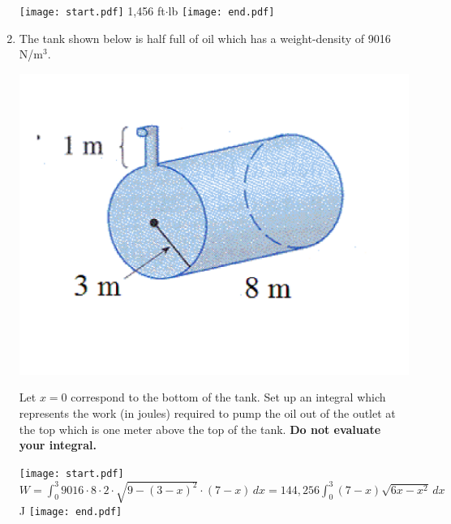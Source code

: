 \documentclass[12pt]{article}
\begin{document}
\begin{enumerate}
\texttt{[image: start.pdf]}
{{1,456 ft$\cdot$lb}}
\texttt{[image: end.pdf]}


\newpage

\item The tank shown below is half full of oil which has a weight-density of 9016 N/m$^3$.  
\begin{center}
\includegraphics[scale=0.3]{tank.pdf}
\end{center}
Let $x=0$ correspond to the bottom of the tank.  Set up an integral which represents the work (in joules) required to pump the oil out of the outlet at the top which is one meter above the top of the tank.  {\bf Do not evaluate your integral.}

\texttt{[image: start.pdf]}
{{$W=\int_0^3 9016 \cdot 8 \cdot 2 \cdot \sqrt{9-(3-x)^2} \cdot (7-x) \,dx= 144,256 \int_0^3 (7-x)\sqrt{6x-x^2}\,dx$ J}}
\texttt{[image: end.pdf]}


\end{enumerate}
\end{document}
